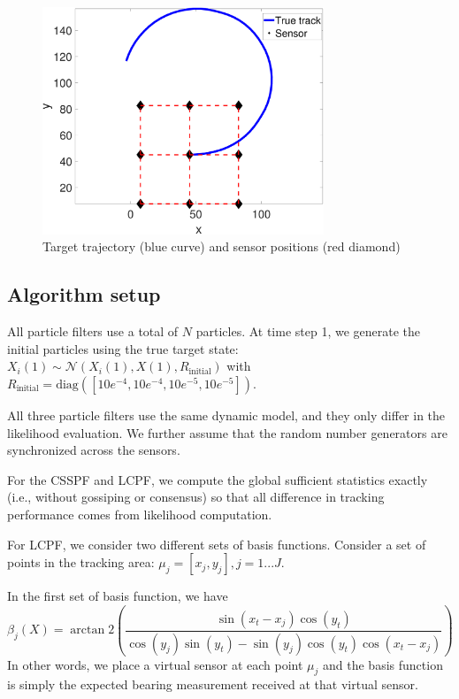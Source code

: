 \documentclass[10pt,letterpaper,final]{article}
\begin{document}
\begin{figure}
\centering
\includegraphics[width=0.75\textwidth]{Figures/Track}
\caption{Target trajectory (blue curve) and sensor positions (red diamond)}
\label{fig:track}
\end{figure}

\subsection{Algorithm setup}
All particle filters use a total of $N$ particles. At time step 1, we generate the initial particles using the true target state: $X_i(1) \sim \mathcal{N}(X_i(1), X(1), R_{\text{initial}})$ with $R_{\text{initial}}=\text{diag}([10e^{-4},10e^{-4},10e^{-5},10e^{-5}])$. 

All three particle filters use the same dynamic model, and
they only differ in the likelihood evaluation. We further assume that the random number generators are synchronized across the sensors. 

For the CSSPF and LCPF, we compute the global sufficient statistics exactly (i.e., without gossiping or consensus) so that all difference in tracking performance comes from likelihood computation. 

For LCPF, we consider two different sets of basis functions. Consider a set of points in the tracking area: $\mu_j = [x_j, y_j], j=1...J$. 

In the first set of basis function, we have
\begin{equation}
\beta_j(X) = \arctan2 \left( \frac{\sin(x_t-x_j)\cos(y_t)}{\cos(y_j)\sin(y_t)-\sin(y_j)\cos(y_t)\cos(x_t-x_j)}  \right)
\end{equation}
In other words, we place a virtual sensor at each point $\mu_j$ and the basis function is simply the expected bearing measurement received at that virtual sensor. 
\end{document}
